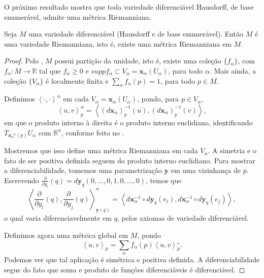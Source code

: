 O próximo resultado mostra que toda variedade diferenciável Hausdorff, de base enumerável, admite uma métrica Riemanniana.
\begin{theorem}
	\label{teo:existencia-metrica}
	Seja $M$ uma variedade diferenciável (Hausdorff e de base enumerável). Então $M$ é uma variedade Riemanniana, isto é, existe uma métrica Riemanniana em $M$.
	\begin{proof}

		Pelo , $M$ possui partição da unidade, isto é, existe uma coleção $\{ f_{\alpha} \}$, com $f_{\alpha}:M\to \mathbb{R}$ tal que $f_{\alpha}\geq0$ e $suppf_{\alpha}\subset V_{\alpha}=\mathbf{x}_{\alpha}(U_{\alpha})$, para todo $\alpha$. Mais ainda, a coleção $\{ V_{\alpha} \}$ é localmente finita e $\sum_{\alpha}f_{\alpha}(p)=1$, para todo $p \in M$.

		Definimos $\left<\cdot,\cdot\right>^{\alpha}$ em cada $V_{\alpha}=\mathbf{x}_{\alpha}(U_{\alpha})$, pondo, para $p \in V_{\alpha}$,
		\begin{equation*}
			\left<u,v\right>_{p}^{\alpha}=\left<(d\mathbf{x}_{\alpha})_{p}^{-1}(u),(d\mathbf{x}_{\alpha})_{p}^{-1}(v)\right>,
		\end{equation*}
		em que o produto interno à direita é o produto interno euclidiano, identificando $T_{\mathbf{x}_{\alpha}^{-1}(p)}U_{\alpha}$ com $\mathbb{R}^{n}$, conforme feito no .

		Mostremos que isso define uma métrica Riemanniana em cada $V_{\alpha}$.
		A simetria e o fato de ser positiva definida seguem do produto interno euclidiano. Para mostrar a diferenciabilidade, tomemos uma parametrização $\mathbf{y}$ em uma vizinhança de $p$. Escrevendo $\frac{\partial}{\partial y_{i}}(q)=d\mathbf{y}_{q}(0, \dots, 0, 1, 0, \dots, 0)$, temos que
		\begin{equation*}
			\left<\frac{\partial}{\partial y_{i}}(q),\frac{\partial}{\partial y_{j}}(q)\right>_{\mathbf{y}(q)}^{\alpha}=\left<d\mathbf{x}_{\alpha}^{-1} \circ d\mathbf{y}_{q}\left(e_i\right),d\mathbf{x}_{\alpha}^{-1} \circ d\mathbf{y}_{q}\left(e_j\right)\right>,
		\end{equation*}
		o qual varia diferenciavelmente em $q$, pelos axiomas de variedade diferenciável.

		Definimos agora uma métrica global em $M$, pondo
		\begin{equation*}
			\left<u,v\right>_{p}=\sum_{\alpha}f_{\alpha}(p)\left<u,v\right>_{p}^{_{\alpha}}.
		\end{equation*}
		Podemos ver que tal aplicação é simétrica e positiva definida. A diferenciabilidade segue do fato que soma e produto de funções diferenciáveis é diferenciável.
	\end{proof}
\end{theorem}
